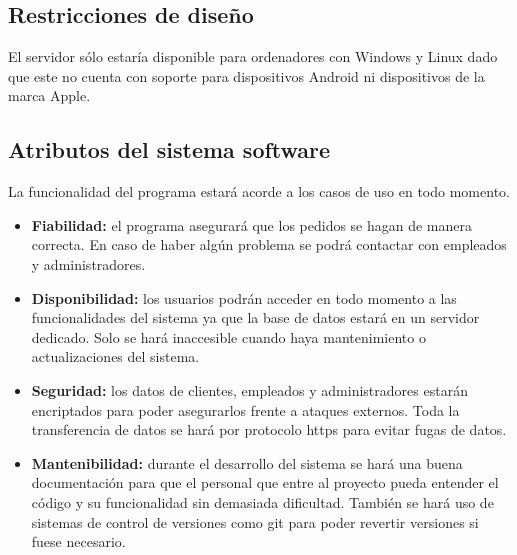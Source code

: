 \subsection{Restricciones de diseño}
El servidor sólo estaría disponible para ordenadores con Windows y Linux dado que este no cuenta con soporte para dispositivos Android ni dispositivos de la marca Apple.
\subsection{Atributos del sistema software}
La funcionalidad del programa estará acorde a los casos de uso en todo momento.
\begin{itemize}
	\item\textbf{Fiabilidad:} el programa asegurará que los pedidos se hagan de manera correcta. En caso de haber algún problema se podrá contactar con empleados y administradores.
	\item\textbf{Disponibilidad:} los usuarios podrán acceder en todo momento a las funcionalidades del sistema ya que la base de datos estará en un servidor dedicado. Solo se hará inaccesible cuando haya mantenimiento o actualizaciones del sistema.
	\item\textbf{Seguridad:} los datos de clientes, empleados y administradores estarán encriptados para poder asegurarlos frente a ataques externos. Toda la transferencia de datos se hará por protocolo \gls{https} para evitar fugas de datos.
	\item\textbf{Mantenibilidad:} durante el desarrollo del sistema se hará una buena documentación para que el personal que entre al proyecto pueda entender el código y su funcionalidad sin demasiada dificultad. También se hará uso de sistemas de control de versiones como git para poder revertir versiones si fuese necesario.
\end{itemize}
